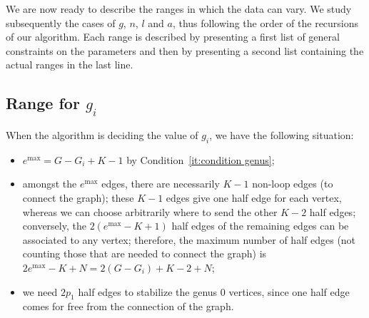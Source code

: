 \documentclass{amsart}
\theoremstyle{plain}
\theoremstyle{definition}
\DeclareMathOperator{\MAX}{max}
\begin{document}
We are now ready to describe the ranges in which the data can vary.
We study subsequently the cases of $g$, $n$, $l$ and $a$, thus
following the order of the recursions of our algorithm. Each range is
described by presenting a first list of general constraints on the
parameters and then by presenting a second list containing the actual
ranges in the last line.



\subsection{Range for $g_i$}

When the algorithm is deciding the value of $g_i$, we have the
following situation:
\begin{itemize}
\item $e^{\MAX} = G - G_i + K - 1$ by Condition~\ref{it:condition
    genus};
\item amongst the $e^{\MAX}$ edges, there are necessarily $K-1$
  non-loop edges (to connect the graph); these $K-1$ edges give one
  half edge for each vertex, whereas we can choose arbitrarily where
  to send the other $K-2$ half edges; conversely, the $2(e^{\MAX} - K
  +1)$ half edges of the remaining edges can be associated to any
  vertex; therefore, the maximum number of half edges (not counting
  those that are needed to connect the graph) is $2e^{\MAX} - K + N =
  2(G - G_i) + K - 2 + N$;
\item we need $2p_1$ half edges to stabilize the genus $0$ vertices,
  since one half edge comes for free from the connection of the graph.
\end{itemize}
\end{document}
